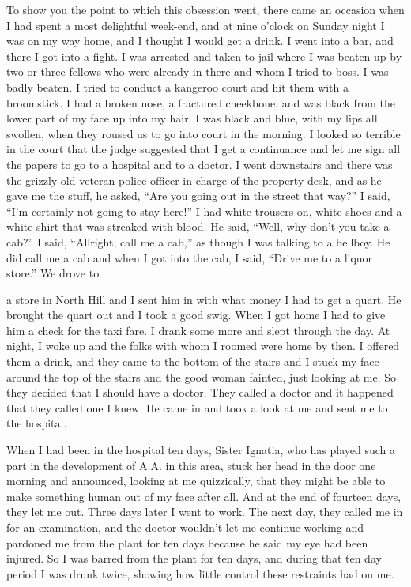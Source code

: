 \begin{biblechapter}
To show you the point to which this obsession went, there came an occasion when I had spent a most delightful week-end, and at nine o’clock on Sunday night I was on my way home, and I thought I would get a drink. I went into a bar, and there I got into a fight. I was arrested and taken to jail where I was beaten up by two or three fellows who were already in there and whom I tried to boss. I was badly beaten. I tried to conduct a kangeroo court and hit them with a broomstick. I had a broken nose, a fractured cheekbone, and was black from the lower part of my face up into my hair. I was black and blue, with my lips all swollen, when they roused us to go into court in the morning. I looked so terrible in the court that the judge suggested that I get a continuance and let me sign all the papers to go to a hospital and to a doctor. I went downstairs and there was the grizzly old veteran police officer in charge of the property desk, and as he gave me the stuff, he asked, “Are you going out in the street that way?” I said, “I’m certainly not going to stay here!” I had white trousers on, white shoes and a white shirt that was streaked with blood. He said, “Well, why don’t you take a cab?” I said, “Allright, call me a cab,” as though I was talking to a bellboy. He did call me a cab and when I got into the cab, I said, “Drive me to a liquor store.” We drove to

a store in North Hill and I sent him in with what money I had to get a quart. He brought the quart out and I took a good swig. When I got home I had to give him a check for the taxi fare. I drank some more and slept through the day. At night, I woke up and the folks with whom I roomed were home by then. I offered them a drink, and they came to the bottom of the stairs and I stuck my face around the top of the stairs and the good woman fainted, just looking at me. So they decided that I should have a doctor. They called a doctor and it happened that they called one I knew. He came in and took a look at me and sent me to the hospital.

When I had been in the hospital ten days, Sister Ignatia, who has played such a part in the development of A.A. in this area, stuck her head in the door one morning and announced, looking at me quizzically, that they might be able to make something human out of my face after all. And at the end of fourteen days, they let me out. Three days later I went to work. The next day, they called me in for an examination, and the doctor wouldn’t let me continue working and pardoned me from the plant for ten days because he said my eye had been injured. So I was barred from the plant for ten days, and during that ten day period I was drunk twice, showing how little control these restraints had on me.


\end{biblechapter}
